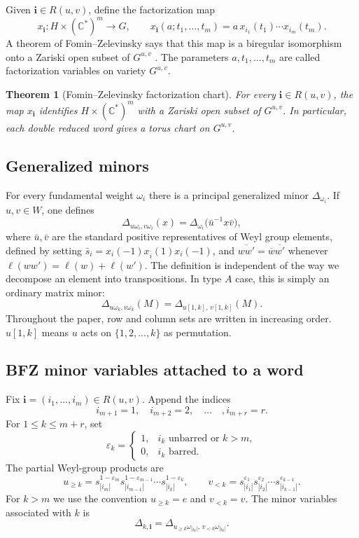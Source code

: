 \documentclass[12pt]{amsart}
\newcommand{\C}{\mathbb C}
\newcommand{\bi}{\mathbf i}
\newcommand{\eps}{\varepsilon}
\theoremstyle{plain}
\newtheorem{theorem}{Theorem}[section]
\theoremstyle{definition}
\theoremstyle{remark}
\begin{document}
Given $\bi\in R(u,v)$, define the factorization map
\[
   x_{\bi}:H\times (\C^*)^m\longrightarrow G,
   \qquad
   x_{\bi}(a;t_1,\ldots,t_m)=a\,x_{i_1}(t_1)\cdots x_{i_m}(t_m).
\]
A theorem of Fomin--Zelevinsky says that this map is a biregular isomorphism onto a Zariski open subset of $G^{u,v}$ \cite{FZ99}.  The parameters $a,t_1,\ldots,t_m$ are called factorization variables on variety $G^{u,v}$.

\begin{theorem}[Fomin--Zelevinsky factorization chart]\label{thm:fz_factor_chart}
For every $\bi\in R(u,v)$, the map $x_{\bi}$ identifies $H\times(\C^*)^m$ with a Zariski open subset of $G^{u,v}$.  In particular, each double reduced word gives a torus chart on $G^{u,v}$.
\end{theorem}

\subsection{Generalized minors}

For every fundamental weight $\omega_i$ there is a principal generalized minor $\Delta_{\omega_i}$.  If $u,v\in W$, one defines
\[
   \Delta_{u\omega_i,v\omega_i}(x)
      =\Delta_{\omega_i}\bigl(\bar u^{-1}x\bar v\bigr),
\]
where $\bar u,\bar v$ are the standard positive representatives of Weyl group elements, defined by setting $\bar s_i=x_i(-1)x_{\bar i}(1)x_i(-1)$, and $\overline{w w'}=\overline w \overline{w'}$ whenever $\ell(w w')=\ell(w)+\ell(w')$.  The definition is independent of the way we decompose an element into transpositions.  In type $A$ case, this is simply an ordinary matrix minor:
\[
   \Delta_{u\omega_k,v\omega_k}(M)=\Delta_{u[1,k],\,v[1,k]}(M).
\]
Throughout the paper, row and column sets are written in increasing order. $u[1,k]$ means $u$ acts on $\{1,2,...,k\}$ as permutation. 

\subsection{BFZ minor variables attached to a word}

Fix $\bi=(i_1,\ldots,i_m)\in R(u,v)$.  Append the indices
\[
   i_{m+1}=1,
   \quad
   i_{m+2}=2,
   \quad\ldots\quad,
   i_{m+r}=r.
\]
For $1\leq k\leq m+r$, set
\[
 \eps_k=\begin{cases}
 1,& i_k\text{ unbarred or }k>m,\\
 0,& i_k\text{ barred.}
 \end{cases}
\]
The partial Weyl-group products are
\[
   u_{\geq k}=s_{|i_m|}^{1-\eps_m}s_{|i_{m-1}|}^{1-\eps_{m-1}}\cdots s_{|i_k|}^{1-\eps_k},
   \qquad
   v_{<k}=s_{|i_1|}^{\eps_1}s_{|i_2|}^{\eps_2}\cdots s_{|i_{k-1}|}^{\eps_{k-1}}.
\]
For $k>m$ we use the convention $u_{\geq k}=e$ and $v_{<k}=v$.  The minor variables associated with $k$ is
\[
   \Delta_{k,\bi}=\Delta_{u_{\geq k}\omega_{|i_k|},\,v_{<k}\omega_{|i_k|}}.
\]
\end{document}
